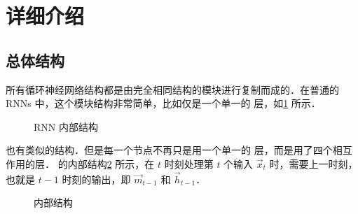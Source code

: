 
\newcommand{\inlinesymbol}[2]{%
  \tikz[baseline = -0.7ex]{\node[#1, scale = 0.7] {#2};}%
}

\clearpage
\section{\lstm{} 详细介绍}
\subsection{\lstm{} 总体结构}
所有循环神经网络结构都是由完全相同结构的模块进行复制而成的．在普通的RNNs 中，这个模块结构非常简单，比如仅是一个单一的 \inlinesymbol{rectangle operator}{$\tanh$} 层，如\cref{fig:Inner Structure of RNN} 所示．%
%
\begin{figure}[!htb]
  \centering
  \scalebox{0.7}{}
  \caption{RNN 内部结构}
  \label{fig:Inner Structure of RNN}
\end{figure}

\lstm{} 也有类似的结构．但是每一个节点不再只是用一个单一的 \inlinesymbol{rectangle operator}{$\tanh$} 层，而是用了四个相互作用的层．\lstm{} 的内部结构\cref{fig:Inner Structure of LSTM} 所示，在 $t$ 时刻处理第 $t$ 个输入 $\vec{x}_t$ 时，需要上一时刻，也就是 $t-1$ 时刻的输出，即 $\vec{m}_{t-1}$ 和 $\vec{h}_{t-1}$．%
%
\begin{figure}[!htb]
  \centering
  \scalebox{0.7}{}
  \caption{\lstm{} 内部结构}
  \label{fig:Inner Structure of LSTM}
\end{figure}%


